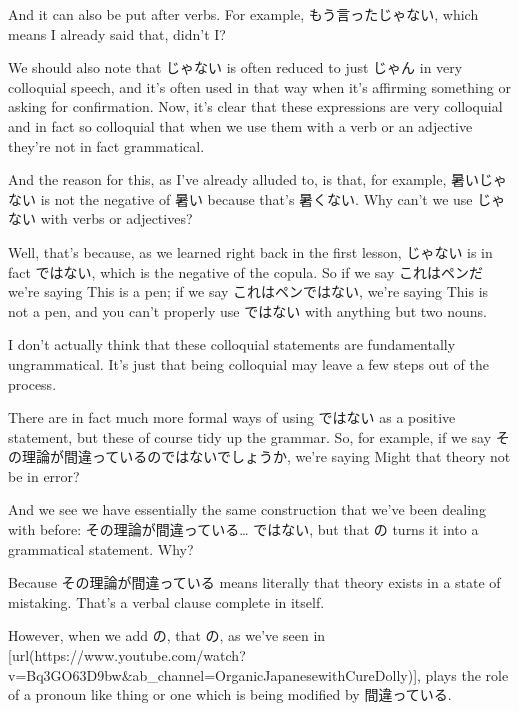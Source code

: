 \thinrule

And it can also be put after verbs. For example, もう言ったじゃない, which means I already said that, didn't I?

We should also note that じゃない is often reduced to just じゃん in very colloquial speech, and it's often used in that way when it's affirming something or asking for confirmation. Now, it's clear that these expressions are very colloquial and in fact so colloquial that when we use them with a verb or an adjective they're not in fact grammatical.

And the reason for this, as I've already alluded to, is that, for example, 暑いじゃない is not the negative of 暑い because that's 暑くない. Why can't we use じゃない with verbs or adjectives?

Well, that's because, as we learned right back in the first lesson, じゃない is in fact ではない, which is the negative of the copula. So if we say これはペンだ we're saying This is a pen; if we say これはペンではない, we're saying This is not a pen, and you can't properly use ではない with anything but two nouns.

{}

I don't actually think that these colloquial statements are fundamentally ungrammatical. It's just that being colloquial may leave a few steps out of the process.

There are in fact much more formal ways of using ではない as a positive statement, but these of course tidy up the grammar. So, for example, if we say その理論が間違っているのではないでしょうか, we're saying Might that theory not be in error?

{}

And we see we have essentially the same construction that we've been dealing with before: その理論が間違っている\ldots{} ではない, but that の turns it into a grammatical statement. Why?

Because その理論が間違っている means literally that theory exists in a state of mistaking. That's a verbal clause complete in itself.

{}

However, when we add の, that の, as we've seen in [url(https://www.youtube.com/watch?v=Bq3GO63D9bw&ab_channel=OrganicJapanesewithCureDolly)], plays the role of a pronoun like thing or one which is being modified by 間違っている.

